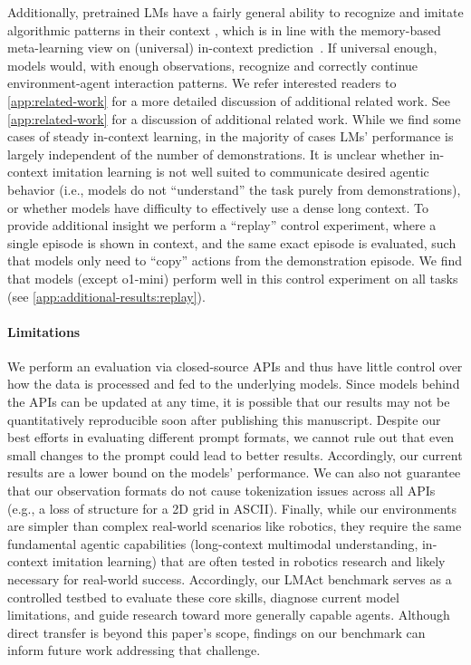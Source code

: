 \documentclass{article}
\newcommand{\eg}{e.g., }
\newcommand{\ie}{i.e., }
\newcommand{\mini}{o1-mini}
\begin{document}
Additionally, pretrained LMs have a fairly general ability to recognize and imitate algorithmic patterns in their context \citep{mirchandani2023large}, which is in line with the memory-based meta-learning view on (universal) in-context prediction~\citep{ortega2019meta, grau2024learning}.
If universal enough, models would, with enough observations, recognize and correctly continue environment-agent interaction patterns.
\ificlr
We refer interested readers to \cref{app:related-work} for a more detailed discussion of additional related work.
\else
See \cref{app:related-work} for a discussion of additional related work.
\fi
While we find some cases of steady in-context learning, in the majority of cases LMs' performance is largely independent of the number of demonstrations.
It is unclear whether in-context imitation learning is not well suited to communicate desired agentic behavior (\ie models do not ``understand'' the task purely from demonstrations), or whether models have difficulty to effectively use a dense long context.
To provide additional insight we perform a ``replay'' control experiment, where a single episode is shown in context, and the same exact episode is evaluated, such that models only need to ``copy'' actions from the demonstration episode.
We find that models (except \mini{}) perform well in this control experiment on all tasks (see \cref{app:additional-results:replay}).
\vspace{-8pt}
\paragraph{Limitations}
We perform an evaluation via closed-source APIs and thus have little control over how the data is processed and fed to the underlying models.
Since models behind the APIs can be updated at any time, it is possible that our results may not be quantitatively reproducible soon after publishing this manuscript.
Despite our best efforts in evaluating different prompt formats, we cannot rule out that even small changes to the prompt could lead to better results.
Accordingly, our current results are a lower bound on the models' performance.
We can also not guarantee that our observation formats do not cause tokenization issues across all APIs (\eg a loss of structure for a 2D grid in ASCII).
Finally, while our environments are simpler than complex real-world scenarios like robotics, they require the same fundamental agentic capabilities (long-context multimodal understanding, in-context imitation learning) that are often tested in robotics research and likely necessary for real-world success.
Accordingly, our LMAct benchmark serves as a controlled testbed to evaluate these core skills, diagnose current model limitations, and guide research toward more generally capable agents.
Although direct transfer is beyond this paper's scope, findings on our benchmark can inform future work addressing that challenge.
\vspace{-8pt}
\end{document}
